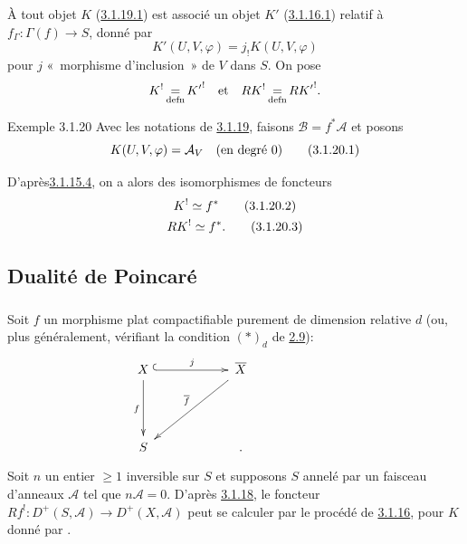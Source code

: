 \documentclass[10pt]{../fichiers-configuration-latex/smfart}
\begin{document}
À tout objet $K$ (\hyperref[XVIII.par3.1.19.1]{3.1.19.1}) est associé un objet $K'$
(\hyperref[XVIII.par3.1.16.1]{3.1.16.1}) 
relatif à $f_{\Gamma}:\Gamma(f)\rightarrow S$, donné par
\begin{equation*}
K'(U,V,\varphi)=j_{!}K(U,V,\varphi)\tag{3.1.19.2}
\end{equation*}%
pour $j$ « morphisme d'inclusion »  de $V$ dans $S$. On pose
$$
K^{!}\mathop{=}_{\operatorname{defn}} {K'}^{!}\quad \text{et}\quad RK^{!}\mathop{=}_{\operatorname{defn}}
R{K'}^{!}{}.
$$

\begin{enonce*}[remark]{Exemple 3.1.20}
Avec les notations de \hyperref[XVIII.exem3.1.19]{3.1.19}, faisons
$\mathcal{B}=f^{\ast}\mathcal{A}$ et posons
\begin{equation*}
K(U,V,\varphi)=\mathcal{A}_{V}\quad\text{\rm(en degré 0)}\tag{3.1.20.1}
\end{equation*}
\end{enonce*}

D'après\pageoriginale \hyperref[XVIII.par3.1.15.4]{3.1.15.4}, on a alors des
isomorphismes de foncteurs
\begin{gather*}
K^{!}\simeq f^{\ast}\tag{3.1.20.2}\\
RK^{!}\simeq f^{\ast}{}.\tag{3.1.20.3}
\end{gather*}

\subsection{Dualité de Poincaré}

\subsubsection{}
Soit $f$ un morphisme plat compactifiable purement de dimension
relative $d$ (ou, plus généralement, vérifiant la condition
$(\ast)_{d}$ de \hyperref[XVIII.thm2.9]{2.9}):
$$
\xymatrix@C=2cm@R=1.5cm@M=.2cm{
X \ar@{^{(}->}[r]^{j} \ar[d]_{f}& \bar{X}\ar[ld]_{\bar{f}} &\\
S &.
}
$$
Soit $n$ un entier $\geq 1$ inversible sur $S$ et supposons $S$ annelé
par un faisceau d'anneaux $\mathcal{A}$ tel que
$n\mathcal{A}=0$. D'après \hyperref[XVIII.exem3.1.18]{3.1.18}, le foncteur
$Rf^{!}:D^{+}(S,\mathcal{A})\rightarrow D^{+}(X,\mathcal{A})$ peut se
calculer par le procédé de \hyperref[XVIII.subsubsec3.1.16]{3.1.16}, pour $K$ donné
par . 
\end{document}
